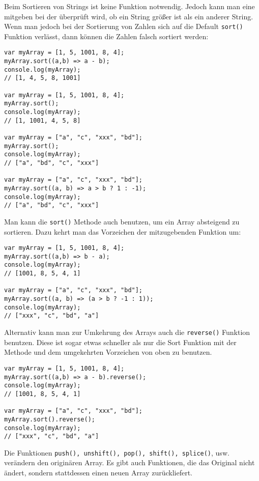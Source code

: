 \documentclass[babel]{book}
\begin{document}
Beim Sortieren von Strings ist keine Funktion notwendig. Jedoch kann man eine mitgeben bei der überprüft wird, ob ein String größer ist als ein anderer String. Wenn man jedoch bei der Sortierung von Zahlen sich auf die Default \lstinline|sort()| Funktion verlässt, dann können die Zahlen falsch sortiert werden:

\begin{lstlisting}[caption=Array Konstruktor]
var myArray = [1, 5, 1001, 8, 4];
myArray.sort((a,b) => a - b);
console.log(myArray);
// [1, 4, 5, 8, 1001]

var myArray = [1, 5, 1001, 8, 4];
myArray.sort();
console.log(myArray);
// [1, 1001, 4, 5, 8]

var myArray = ["a", "c", "xxx", "bd"];
myArray.sort();
console.log(myArray);
// ["a", "bd", "c", "xxx"]

var myArray = ["a", "c", "xxx", "bd"];
myArray.sort((a, b) => a > b ? 1 : -1);
console.log(myArray);
// ["a", "bd", "c", "xxx"]
\end{lstlisting}

Man kann die \lstinline|sort()| Methode auch benutzen, um ein Array absteigend zu sortieren. Dazu kehrt man das Vorzeichen der mitzugebenden Funktion um:

\begin{lstlisting}[caption=Array Konstruktor]
var myArray = [1, 5, 1001, 8, 4];
myArray.sort((a,b) => b - a);
console.log(myArray);
// [1001, 8, 5, 4, 1]

var myArray = ["a", "c", "xxx", "bd"];
myArray.sort((a, b) => (a > b ? -1 : 1));
console.log(myArray);
// ["xxx", "c", "bd", "a"]
\end{lstlisting}

Alternativ kann man zur Umkehrung des Arrays auch die \lstinline|reverse()| Funktion benutzen. Diese ist sogar etwas schneller als nur die Sort Funktion mit der Methode und dem umgekehrten Vorzeichen von oben zu benutzen.

\begin{lstlisting}[caption=Array Konstruktor]
var myArray = [1, 5, 1001, 8, 4];
myArray.sort((a,b) => a - b).reverse();
console.log(myArray);
// [1001, 8, 5, 4, 1]

var myArray = ["a", "c", "xxx", "bd"];
myArray.sort().reverse();
console.log(myArray);
// ["xxx", "c", "bd", "a"]
\end{lstlisting}

Die Funktionen \lstinline|push(), unshift(), pop(), shift(), splice()|, usw. verändern den originären Array. Es gibt auch Funktionen, die das Original nicht ändert, sondern stattdessen einen neuen Array zurückliefert.
\end{document}

